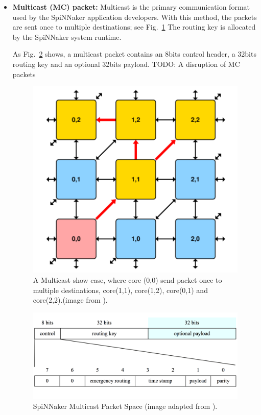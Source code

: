 \begin{itemize}
    \item \textbf{Multicast (MC) packet:} Multicast is the primary communication format used by the SpiNNaker application developers. With this method, the packets are sent once to multiple destinations; see Fig.~\ref{fig:multicast}  The routing key is allocated by the SpiNNaker system runtime. 
    
    As Fig.~\ref{fig:mc_pkt_layout} shows, a multicast packet contains an 8bits control header, a 32bits routing key and an optional 32bits payload. TODO: A disruption of MC packets
    
    \begin{figure}[tb]
    \centering
    \includegraphics[width = 0.8\hsize]{figures/multicast.png}
    \caption{A Multicast show case, where core (0,0) send packet once to multiple destinations, core(1,1), core(1,2), core(0,1) and core(2,2).(image from \cite{ws6}).}
    \label{fig:multicast}
    \end{figure}
    
    \begin{figure}[tb]
    \centering
    \includegraphics[width = 1\hsize]{figures/mc_pkt_layout.png}
    \caption{SpiNNaker Multicast Packet Space (image adapted from \cite{mc_pkt_layout}).}
    \label{fig:mc_pkt_layout}
    \end{figure}
    

\end{itemize}
